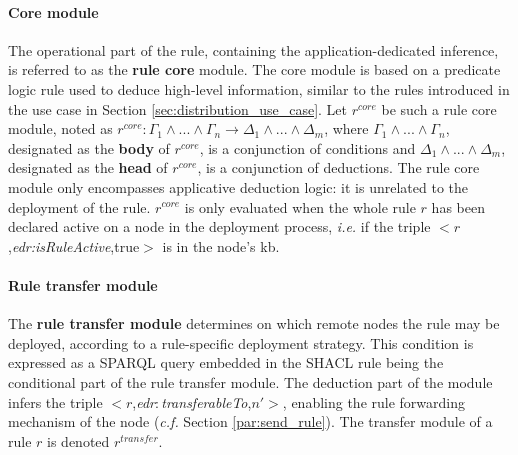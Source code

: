 \documentclass{iosart2c}
\newcommand{\namespace}[1]{\textit{#1$:$}}
\newcommand{\concept}[2]{\namespace{#1}\-\textit{#2}}
\newcommand{\triplet}[3]{$<$#1,\textit{#2},#3$>$}
\begin{document}
\paragraph{Core module}
The operational part of the rule, containing the application-dedicated inference, is referred to as the \textbf{rule core} module. 
The core module is based on a predicate logic rule used to deduce high-level information, similar to the rules introduced in the use case in Section \textsection \ref{sec:distribution_use_case}. 
Let $r^{core}$ be such a rule core module, noted as $r^{core}: \Gamma_1 \land ... \land \Gamma_n \rightarrow \Delta_1 \land ... \land \Delta_m$, where $\Gamma_1 \land ... \land \Gamma_n$, designated as the \textbf{body} of $r^{core}$, is a conjunction of conditions and $\Delta_1 \land ... \land \Delta_m$, designated as the \textbf{head} of $r^{core}$, is a conjunction of deductions.
The rule core module only encompasses applicative deduction logic: it is unrelated to the deployment of the rule.
$r^{core}$ is only evaluated when the whole rule $r$ has been declared active on a node in the deployment process, \textit{i.e.} if the triple \triplet{$r$}{edr:is\-Rule\-Active}{true} is in the node's \gls{kb}.

\paragraph{Rule transfer module}
The \textbf{rule transfer module} determines on which remote nodes the rule may be deployed, according to a rule-specific deployment strategy.
This condition is expressed as a SPARQL query embedded in the SHACL rule being the conditional part of the rule transfer module.
The deduction part of the module infers the triple \triplet{$r$}{\concept{edr}{transferable\-To}}{$n'$}, enabling the rule forwarding mechanism of the node (\textit{c.f.} Section \textsection \ref{par:send_rule}).
The transfer module of a rule $r$ is denoted $r^{transfer}$.

\end{document}
